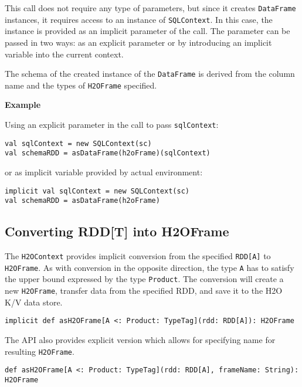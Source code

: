 This call does not require any type of parameters, but since it creates \texttt{DataFrame} instances, it requires access to an instance of \texttt{SQLContext}. In this case, the instance is provided as an implicit parameter of the call. The parameter can be passed in two ways: as an explicit parameter or by introducing an implicit variable into the current context.

The schema of the created instance of the \texttt{DataFrame} is derived from the column name and the types of \texttt{H2OFrame} specified.

\textbf{Example}

Using an explicit parameter in the call to pass \texttt{sqlContext}:

\begin{lstlisting}[style=Scala]
val sqlContext = new SQLContext(sc)
val schemaRDD = asDataFrame(h2oFrame)(sqlContext)
\end{lstlisting}

or as implicit variable provided by actual environment:

\begin{lstlisting}[style=Scala]
implicit val sqlContext = new SQLContext(sc)
val schemaRDD = asDataFrame(h2oFrame)
\end{lstlisting}

\subsection{Converting RDD[T] into H2OFrame}

The \texttt{H2OContext} provides implicit conversion from the specified \texttt{RDD[A]} to \texttt{H2OFrame}. As with conversion in the opposite direction, the type \texttt{A} has to satisfy the upper bound expressed by the type \texttt{Product}. The conversion will create a new \texttt{H2OFrame}, transfer data from the specified RDD, and save it to the H2O K/V data store.

\begin{lstlisting}[style=Scala]
implicit def asH2OFrame[A <: Product: TypeTag](rdd: RDD[A]): H2OFrame
\end{lstlisting}

The API also provides explicit version which allows for specifying name for resulting \texttt{H2OFrame}.

\begin{lstlisting}[style=Scala]
def asH2OFrame[A <: Product: TypeTag](rdd: RDD[A], frameName: String): H2OFrame
\end{lstlisting}

